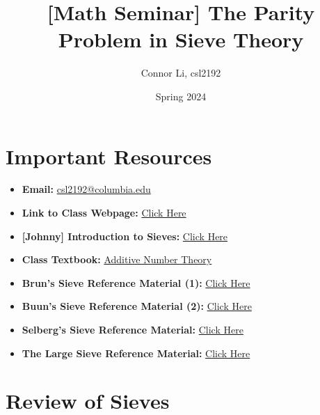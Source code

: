 \documentclass[8pt]{extarticle}
\title{[Math Seminar] The Parity Problem in Sieve Theory}
\author{Connor Li, csl2192}
\date{Spring 2024}
\begin{document}
\maketitle

\section*{Important Resources}
\begin{itemize}
    \item \textbf{Email:} \href{mailto:csl2192@columbia.edu}{csl2192@columbia.edu}
    \item \textbf{Link to Class Webpage:} \href{https://www.math.columbia.edu/~avizeff/additive/index.html}{Click Here}
    \item \textbf{[Johnny] Introduction to Sieves:} \href{https://www.math.columbia.edu/~avizeff/additive/talk_10.pdf}{Click Here}
    \item \textbf{Class Textbook:} \href{http://www.alefenu.com/libri/nathansonbases.pdf}{Additive Number Theory}
    \item \textbf{Brun's Sieve Reference Material (1):} \href{https://www.math.columbia.edu/~avizeff/additive/talk_12.pdf}{Click Here}
    \item \textbf{Buun's Sieve Reference Material (2):} \href{https://www.math.columbia.edu/~avizeff/additive/talk_13.pdf}{Click Here}
    \item \textbf{Selberg's Sieve Reference Material:} \href{https://www.math.columbia.edu/~avizeff/additive/talk_14.pdf}{Click Here}
    \item \textbf{The Large Sieve Reference Material:} \href{https://columbiauniversity.zoom.us/rec/play/rxd23-9BFy8ZeuEKEmh7rsgU_MFA4J9SygcsxBNFDDySy4bUon6aie6KVECuYWQ1w4XldraaB7LqCxU0.FPuBLFNwvPNu3GKA?autoplay=true&startTime=1712158850000}{Click Here}
\end{itemize}

\tableofcontents   


\pagebreak
\section{Review of Sieves}
\end{document}
